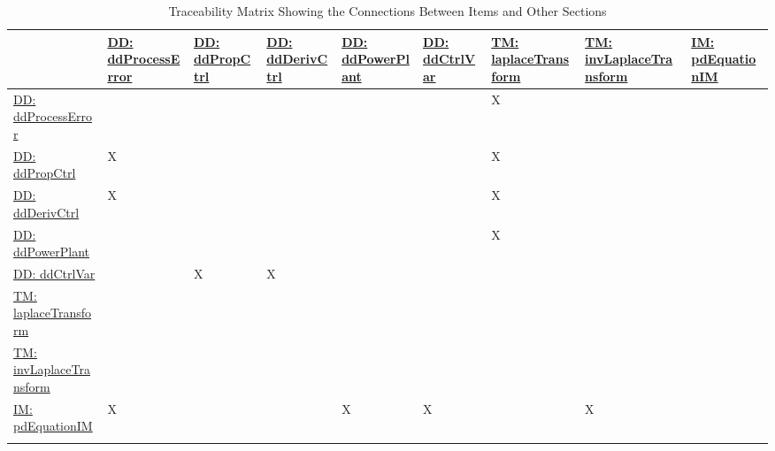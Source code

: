 \documentclass[12pt]{article}
\begin{document}
\begin{longtable}{l l l l l l l l l}
\toprule
\textbf{} & \textbf{\hyperref[DD:ddProcessError]{DD: ddProcessError}} & \textbf{\hyperref[DD:ddPropCtrl]{DD: ddPropCtrl}} & \textbf{\hyperref[DD:ddDerivCtrl]{DD: ddDerivCtrl}} & \textbf{\hyperref[DD:ddPowerPlant]{DD: ddPowerPlant}} & \textbf{\hyperref[DD:ddCtrlVar]{DD: ddCtrlVar}} & \textbf{\hyperref[TM:laplaceTransform]{TM: laplaceTransform}} & \textbf{\hyperref[TM:invLaplaceTransform]{TM: invLaplaceTransform}} & \textbf{\hyperref[IM:pdEquationIM]{IM: pdEquationIM}}
\\
\midrule
\endhead
\hyperref[DD:ddProcessError]{DD: ddProcessError} &  &  &  &  &  & X &  & 
\\
\hyperref[DD:ddPropCtrl]{DD: ddPropCtrl} & X &  &  &  &  & X &  & 
\\
\hyperref[DD:ddDerivCtrl]{DD: ddDerivCtrl} & X &  &  &  &  & X &  & 
\\
\hyperref[DD:ddPowerPlant]{DD: ddPowerPlant} &  &  &  &  &  & X &  & 
\\
\hyperref[DD:ddCtrlVar]{DD: ddCtrlVar} &  & X & X &  &  &  &  & 
\\
\hyperref[TM:laplaceTransform]{TM: laplaceTransform} &  &  &  &  &  &  &  & 
\\
\hyperref[TM:invLaplaceTransform]{TM: invLaplaceTransform} &  &  &  &  &  &  &  & 
\\
\hyperref[IM:pdEquationIM]{IM: pdEquationIM} & X &  &  & X & X &  & X & 
\\
\bottomrule
\caption{Traceability Matrix Showing the Connections Between Items and Other Sections}
\label{Table:TraceMatRefvsRef}
\end{longtable}
\end{document}
